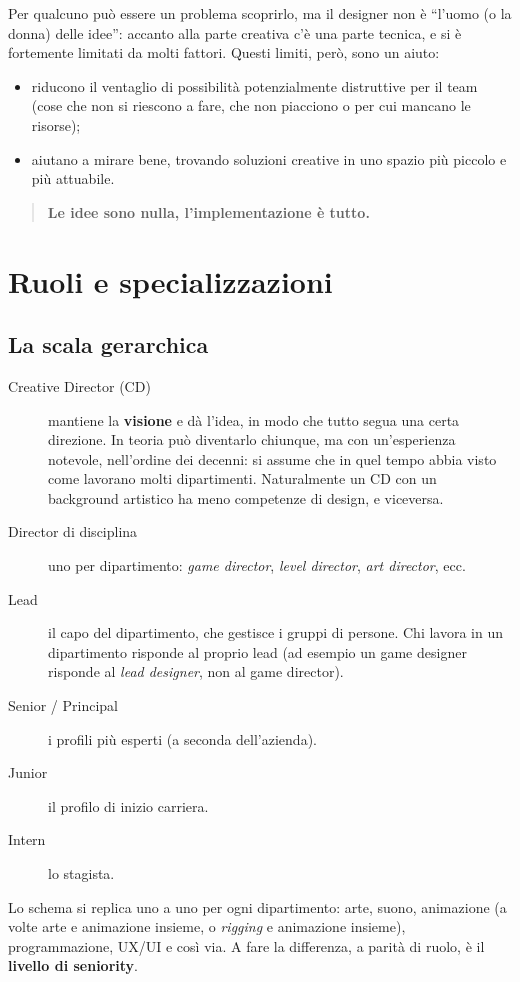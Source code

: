Per qualcuno può essere un problema scoprirlo, ma il designer non è
``l'uomo (o la donna) delle idee'': accanto alla parte creativa c'è una parte
tecnica, e si è fortemente limitati da molti fattori. Questi limiti, però,
sono un aiuto:
\begin{itemize}
  \item riducono il ventaglio di possibilità potenzialmente distruttive per il
        team (cose che non si riescono a fare, che non piacciono o per cui
        mancano le risorse);
  \item aiutano a mirare bene, trovando soluzioni creative in uno spazio più
        piccolo e più attuabile.
\end{itemize}

\begin{quote}
\centering
\textbf{Le idee sono nulla, l'implementazione è tutto.}
\end{quote}

\section{Ruoli e specializzazioni}
\label{sec:tipi-designer}



\subsection{La scala gerarchica}

\begin{description}
  \item[Creative Director (CD)] mantiene la \textbf{visione} e dà l'idea, in
        modo che tutto segua una certa direzione. In teoria può diventarlo
        chiunque, ma con un'esperienza notevole, nell'ordine dei decenni: si
        assume che in quel tempo abbia visto come lavorano molti dipartimenti.
        Naturalmente un CD con un background artistico ha meno competenze di
        design, e viceversa.
  \item[Director di disciplina] uno per dipartimento: \emph{game director},
        \emph{level director}, \emph{art director}, ecc.
  \item[Lead] il capo del dipartimento, che gestisce i gruppi di persone. Chi
        lavora in un dipartimento risponde al proprio lead (ad esempio un game
        designer risponde al \emph{lead designer}, non al game director).
  \item[Senior / Principal] i profili più esperti (a seconda dell'azienda).
  \item[Junior] il profilo di inizio carriera.
  \item[Intern] lo stagista.
\end{description}
Lo schema si replica uno a uno per ogni dipartimento: arte, suono, animazione
(a volte arte e animazione insieme, o \emph{rigging} e animazione insieme),
programmazione, UX/UI e così via. A fare la differenza, a parità di ruolo, è
il \textbf{livello di seniority}.


